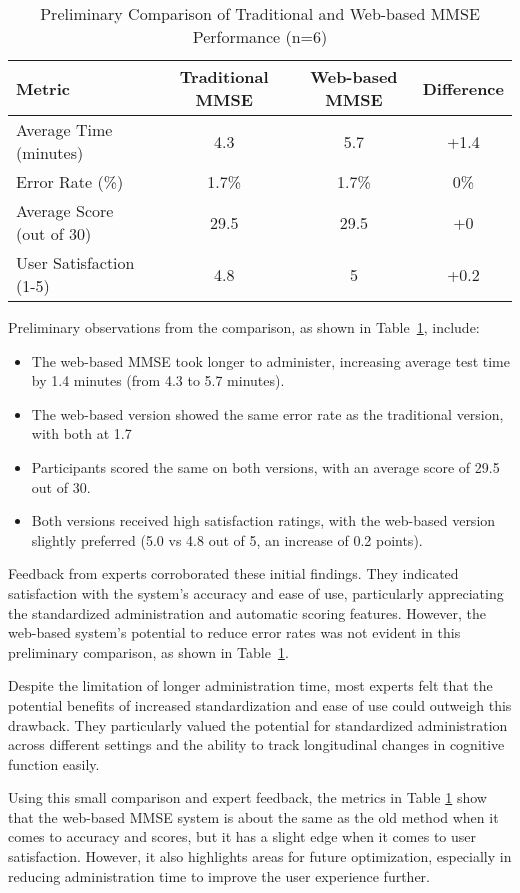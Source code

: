 \begin{table}[ht]
\centering
\begin{tabular}{|l|c|c|c|}
\hline
\textbf{Metric} & \textbf{Traditional MMSE} & \textbf{Web-based MMSE} & \textbf{Difference} \\
\hline
Average Time (minutes) & 4.3 & 5.7 & +1.4 \\
Error Rate (\%) & 1.7\% & 1.7\% & 0\% \\
Average Score (out of 30) & 29.5 & 29.5 & +0 \\
User Satisfaction (1-5) & 4.8 & 5 & +0.2 \\
\hline
\end{tabular}
\caption{Preliminary Comparison of Traditional and Web-based MMSE Performance (n=6)}
\label{tab:mmse_comparison}
\end{table}

Preliminary observations from the comparison, as shown in Table~\ref{tab:mmse_comparison}, include:
\begin{itemize}
\item The web-based MMSE took longer to administer, increasing average test time by 1.4 minutes (from 4.3 to 5.7 minutes).
\item The web-based version showed the same error rate as the traditional version, with both at 1.7%
\item Participants scored the same on both versions, with an average score of 29.5 out of 30.
\item Both versions received high satisfaction ratings, with the web-based version slightly preferred (5.0 vs 4.8 out of 5, an increase of 0.2 points).
\end{itemize}
Feedback from experts corroborated these initial findings. They indicated satisfaction with the system's accuracy and ease of use, particularly appreciating the standardized administration and automatic scoring features. However, the web-based system's potential to reduce error rates was not evident in this preliminary comparison, as shown in Table~\ref{tab:mmse_comparison}.

Despite the limitation of longer administration time, most experts felt that the potential benefits of increased standardization and ease of use could outweigh this drawback. They particularly valued the potential for standardized administration across different settings and the ability to track longitudinal changes in cognitive function easily.

Using this small comparison and expert feedback, the metrics in Table \ref{tab:mmse_comparison} show that the web-based MMSE system is about the same as the old method when it comes to accuracy and scores, but it has a slight edge when it comes to user satisfaction. However, it also highlights areas for future optimization, especially in reducing administration time to improve the user experience further.

